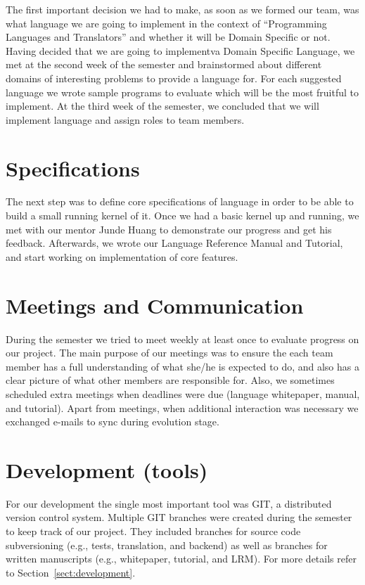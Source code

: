 The first important decision we had to make, as soon as we formed
our team, was what language we are going to implement in the context of
``Programming Languages and Translators'' and whether it will be Domain
Specific or not. Having decided that we are going to implementva Domain
Specific Language, we met at the second week of the semester and brainstormed
about different domains of interesting problems to provide a language for.
For each suggested language we wrote sample programs to evaluate which will be
the most fruitful to implement. At the third week of the semester, we concluded
that we will implement \lang{} language and assign roles to team members.

\section{Specifications}
The next step was to define core specifications of \lang{} language in order to
be able to build a small running kernel of it. Once we had a basic kernel up
and running, we met with our mentor Junde Huang to demonstrate our progress
and get his feedback. Afterwards, we wrote our Language Reference Manual and
Tutorial, and start working on implementation of core features.

\section{Meetings and Communication}
During the semester we tried to meet weekly at least once to evaluate progress
on our project. The main purpose of our meetings was to ensure the each team
member has a full understanding of what she/he is expected to do, and also has a
clear picture of what other members are responsible for. Also, we
sometimes scheduled extra meetings when deadlines were due (language whitepaper,
manual, and tutorial). Apart from meetings, when additional interaction was
necessary we exchanged e-mails to sync during evolution stage.

\section{Development (tools)}
For our development the single most important tool was GIT, a distributed
version control system. Multiple GIT branches were created during the semester
to keep track of our project. They included branches for source code
subversioning (e.g., tests, translation, and \lang{} backend) as well as
branches for written manuscripts (e.g., whitepaper, tutorial,  and LRM).
For more details refer to Section~\ref{sect:development}.



